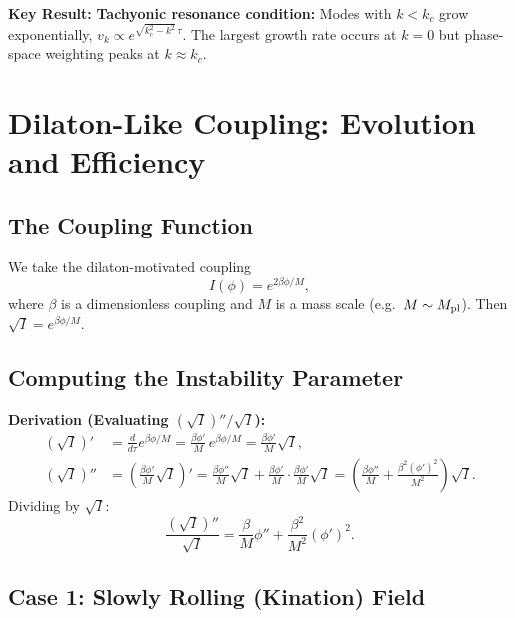\documentclass[12pt,a4paper,openany]{book}
\newcommand{\vk}{v_k}
\newcommand{\sqI}{\sqrt{I}}
\newcommand{\Mpl}{M_{\rm pl}}
\newcommand{\kc}{k_c}
\begin{document}
\medskip
\noindent\textbf{Key Result:} \textbf{Tachyonic resonance condition:} Modes with $k < \kc$ grow exponentially,
$\vk \propto e^{\sqrt{k_c^2 - k^2}\,\tau}$.
The largest growth rate occurs at $k=0$ but phase-space weighting peaks at $k \approx \kc$.

\chapter{Dilaton-Like Coupling: Evolution and Efficiency}

\section{The Coupling Function}

We take the dilaton-motivated coupling
\begin{equation}
  I(\phi) = e^{2\beta\phi/M},
\end{equation}
where $\beta$ is a dimensionless coupling and $M$ is a mass scale (e.g.\ $M \sim \Mpl$). Then $\sqI = e^{\beta\phi/M}$.

\section{Computing the Instability Parameter}

\noindent\textbf{Derivation (Evaluating $(\sqI)''/\sqI$):}
\begin{align}
  (\sqI)' &= \frac{d}{d\tau}e^{\beta\phi/M} = \frac{\beta\phi'}{M}\,e^{\beta\phi/M} = \frac{\beta\phi'}{M}\sqI, \\
  (\sqI)'' &= \left(\frac{\beta\phi'}{M}\sqI\right)' = \frac{\beta\phi''}{M}\sqI + \frac{\beta\phi'}{M}\cdot\frac{\beta\phi'}{M}\sqI = \left(\frac{\beta\phi''}{M} + \frac{\beta^2(\phi')^2}{M^2}\right)\sqI.
\end{align}
Dividing by $\sqI$:
\begin{equation}
  \frac{(\sqI)''}{\sqI} = \frac{\beta}{M}\phi'' + \frac{\beta^2}{M^2}(\phi')^2.
\end{equation}

\section{Case 1: Slowly Rolling (Kination) Field}
\end{document}
